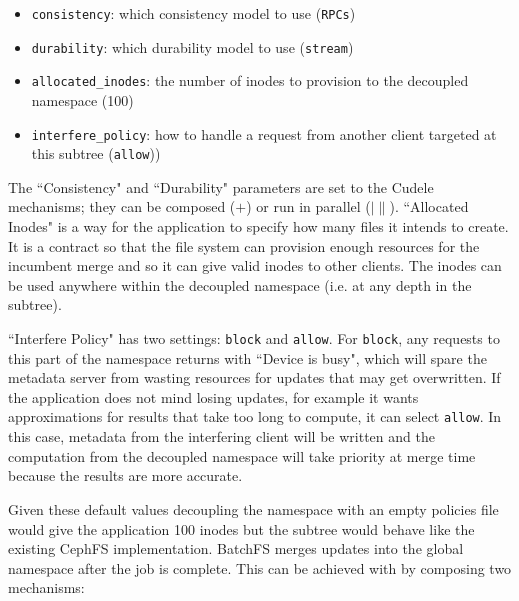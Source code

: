 \begin{itemize}

  \item \texttt{consistency}: which consistency model to use (\texttt{RPCs})

  \item \texttt{durability}: which durability model to use (\texttt{stream})

  \item \texttt{allocated\_inodes}: the number of inodes to provision to the
  decoupled namespace (100)

  \item \texttt{interfere\_policy}: how to handle a request from another
  client targeted at this subtree (\texttt{allow}))

\end{itemize}

The ``Consistency" and ``Durability" parameters are set to the Cudele
mechanisms; they can be composed (\(+\)) or run in parallel (\(|\|\)).
``Allocated Inodes" is a way for the application to specify how many files it
intends to create. It is a contract so that the file system can provision
enough resources for the incumbent merge and so it can give valid inodes to
other clients. The inodes can be used anywhere within the decoupled namespace
({i.e.} at any depth in the subtree).

``Interfere Policy" has two settings: \texttt{block} and \texttt{allow}.
For \texttt{block}, any requests to this part of the namespace returns with
``Device is busy", which will spare the metadata server from wasting resources
for updates that may get overwritten. If the application does not mind losing
updates, for example it wants approximations for results that take too long to
compute, it can select \texttt{allow}. In this case, metadata from the interfering client will be
written and the computation from the decoupled namespace will take priority at
merge time because the results are more accurate.

Given these default values decoupling the namespace with an empty policies file
would give the application 100 inodes but the subtree would behave like the
existing CephFS implementation.  BatchFS merges updates into the global
namespace after the job is complete.  This can be achieved with by composing
two mechanisms: 
